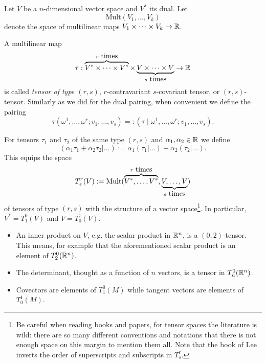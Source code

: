 \begin{definition}
  Let $V$ be a $n$-dimensional vector space and $V^*$ its dual.
  Let
  \begin{equation}
    \mathrm{Mult}(V_1, \ldots, V_k)
  \end{equation}
  denote the space of multilinear maps $V_1\times\cdots\times V_k\to\mathbb{R}$.

  A multilinear map
  \begin{equation}
    \tau : \LaTeXoverbrace{V^*\times \cdots \times V^*}^{r\mbox{ times}} \times \LaTeXunderbrace{V \times \cdots \times V}_{s\mbox{ times}} \to \R
  \end{equation}
  is called \emph{tensor of type $(r,s)$}, $r$-contravariant $s$-covariant tensor, or $(r,s)$-tensor.
  Similarly as we did for the dual pairing, when convenient we define the pairing
  \begin{equation}
    \tau\left(\omega^1, \ldots, \omega^r; v_1, \ldots, v_s\right) 
    =: \left(\tau \mid \omega^1, \ldots, \omega^r; v_1, \ldots, v_s \right).
  \end{equation}

  For tensors $\tau_1$ and $\tau_2$ of the same type $(r,s)$ and $\alpha_1, \alpha_2\in\mathbb{R}$ we define
  \begin{equation}
    \left(\alpha_1\tau_1 + \alpha_2\tau_2 | \ldots \right) := \alpha_1\left(\tau_1 | \ldots \right) + \alpha_2 \left(\tau_2 | \ldots \right).
  \end{equation}
  This equips the space 
  \begin{equation}
    T^r_s(V) := \mathrm{Mult}(\LaTeXoverbrace{V^*,\ldots,V^*}^{r \mbox{ times}}, \LaTeXunderbrace{V, \ldots, V}_{s \mbox{ times}})
  \end{equation}
  of tensors of type $(r,s)$ with the structure of a vector space\footnote{Be careful when reading books and papers, for tensor spaces the literature is wild: there are so many different conventions and notations that there is not enough space on this margin to mention them all. Note that the book of Lee inverts the order of superscripts and subscripts in $T^r_s$.}. %
  In particular, $V^* = T_1^0(V)$ and $V=T_0^1(V)$.
\end{definition}

\begin{example}
  \begin{itemize}
    \item An inner product on $V$, e.g. the scalar product in $\mathbb{R}^n$, is a $(0,2)$-tensor.
    This means, for example that the aforementioned scalar product is an element of $T^0_2(\mathbb{R}^n)$.
    \item The determinant, thought as a function of $n$ vectors, is a tensor in $T_n^0(\mathbb{R}^n)$.
    \item Covectors are elements of $T_1^0(M)$ while tangent vectors are elements of $T_0^1(M)$.
  \end{itemize}
\end{example}

